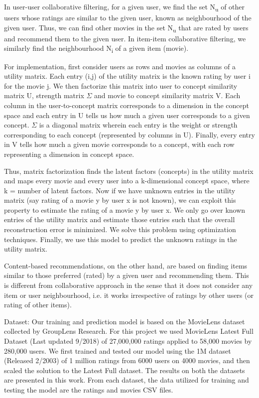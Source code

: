 \documentclass[sigconf]{acmart}
\begin{document}
In user-user collaborative filtering, for a given user, we find the set N\textsubscript{u} of other users whose ratings are similar to the given user, known as neighbourhood of the given user. Thus, we can find other movies in the set N\textsubscript{u} that are rated by users and recommend them to the given user. In item-item collaborative filtering, we similarly find the neighbourhood N\textsubscript{i} of a given item (movie).

For implementation, first consider users as rows and movies as columns of a utility matrix. Each entry (i,j) of the utility matrix is the known rating by user i for the movie j. We then factorize this matrix into user to concept similarity matrix U, strength matrix \begin{math}\Sigma\end{math} and movie to concept similarity matrix V. Each column in the user-to-concept matrix corresponds to a dimension in the concept space and each entry in U tells us how much a given user corresponds to a given concept. \begin{math}\Sigma\end{math} is a diagonal matrix wherein each entry is the weight or strength corresponding to each concept (represented by columns in U). Finally, every entry in V tells how much a given movie corresponds to a concept, with each row representing a dimension in concept space.

Thus, matrix factorization finds the latent factors (concepts) in the utility matrix and maps every movie and every user into a k-dimensional concept space, where k = number of latent factors. Now if we have unknown entries in the utility matrix (say rating of a movie y by user x is not known), we can exploit this property to estimate the rating of a movie y by user x. We only go over known entries of the utility matrix and estimate those entries such that the overall reconstruction error is minimized. We solve this problem using optimization techniques. Finally, we use this model to predict the unknown ratings in the utility matrix.

Content-based recommendations, on the other hand, are based on finding items similar to those preferred (rated) by a given user and recommending them. This is different from collaborative approach in the sense that it does not consider any item or user neighbourhood, i.e. it works irrespective of ratings by other users (or rating of other items).

Dataset: 
Our training and prediction model is based on the MovieLens dataset \cite{movielens} collected by GroupLens Research. For this project we used MovieLens Latest Full Dataset (Last updated 9/2018) of 27,000,000 ratings applied to 58,000 movies by 280,000 users. We first trained and tested our model using the 1M dataset (Released 2/2003) of 1 million ratings from 6000 users on 4000 movies, and then scaled the solution to the Latest Full dataset. The results on both the datasets are presented in this work. From each dataset, the data utilized for training and testing the model are the ratings and movies CSV files.
\end{document}
